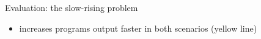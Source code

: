 \documentclass[8pt, aspectratio=169, handout]{beamer}
\begin{document}
\begin{frame}{Evaluation: the slow-rising problem}
\begin{card}[Results]
\begin{itemize}
      \begin{itemize}
        \item increases programs output faster in both scenarios (yellow line)
      \end{itemize}
    \end{itemize}
  \end{card}
  \begin{multicols}{3}
  \end{multicols}
\end{frame}
\end{document}
